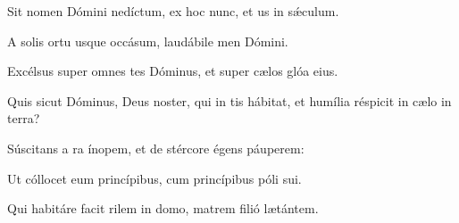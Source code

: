 \item {}

\item Sit nomen Dómini nedíctum,\psstar{} ex hoc nunc, et us in sǽculum.

\item A solis ortu usque  occásum,\psstar{} laudábile men Dómini.

\item Excélsus super omnes tes Dóminus,\psstar{} et super cælos glóa eius.

\item Quis sicut Dóminus, Deus noster, qui in tis hábitat,\psstar{} et humília réspicit in cælo  in terra?

\item Súscitans a ra ínopem,\psstar{} et de stércore égens páuperem:

\item Ut cóllocet eum  princípibus,\psstar{} cum princípibus póli sui.

\item Qui habitáre facit rilem in domo,\psstar{} matrem filió lætántem.